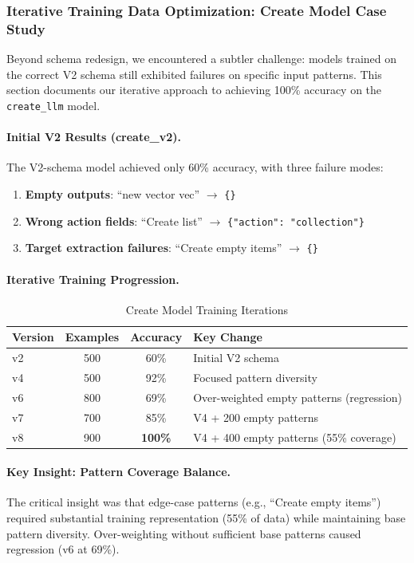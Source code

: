 \documentclass[11pt,a4paper]{article}
\begin{document}
\subsubsection{Iterative Training Data Optimization: Create Model Case Study}
\label{sec:create-model-optimization}

Beyond schema redesign, we encountered a subtler challenge: models trained on the correct V2 schema still exhibited failures on specific input patterns. This section documents our iterative approach to achieving 100\% accuracy on the \texttt{create\_llm} model.

\paragraph{Initial V2 Results (create\_v2).} The V2-schema model achieved only 60\% accuracy, with three failure modes:
\begin{enumerate}
    \item \textbf{Empty outputs}: ``new vector vec'' $\to$ \texttt{\{\}}
    \item \textbf{Wrong action fields}: ``Create list'' $\to$ \texttt{\{"action": "collection"\}}
    \item \textbf{Target extraction failures}: ``Create empty items'' $\to$ \texttt{\{\}}
\end{enumerate}

\paragraph{Iterative Training Progression.}

\begin{table}[h]
\caption{Create Model Training Iterations}
\centering
\begin{tabular}{@{}lccl@{}}
\toprule
Version & Examples & Accuracy & Key Change \\
\midrule
v2 & 500 & 60\% & Initial V2 schema \\
v4 & 500 & 92\% & Focused pattern diversity \\
v6 & 800 & 69\% & Over-weighted empty patterns (regression) \\
v7 & 700 & 85\% & V4 + 200 empty patterns \\
v8 & 900 & \textbf{100\%} & V4 + 400 empty patterns (55\% coverage) \\
\bottomrule
\end{tabular}
\end{table}

\paragraph{Key Insight: Pattern Coverage Balance.} The critical insight was that edge-case patterns (e.g., ``Create empty items'') required substantial training representation (55\% of data) while maintaining base pattern diversity. Over-weighting without sufficient base patterns caused regression (v6 at 69\%).
\end{document}

